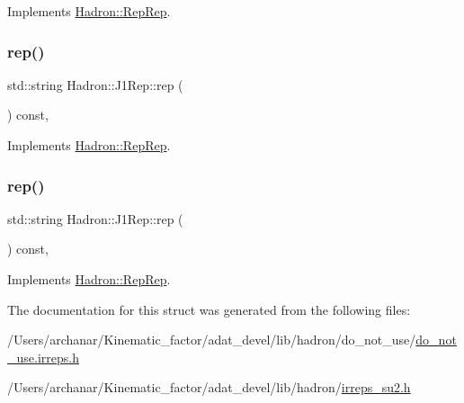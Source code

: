 Implements \mbox{\hyperlink{structHadron_1_1RepRep_ab3213025f6de249f7095892109575fde}{Hadron\+::\+Rep\+Rep}}.

\mbox{\label{structHadron_1_1J1Rep_af725f8ff10c84cda5410728ce30697da}} 
\subsubsection{\texorpdfstring{rep()}{rep()}\hspace{0.1cm}{\footnotesize\ttfamily [2/3]}}
{\footnotesize\ttfamily std\+::string Hadron\+::\+J1\+Rep\+::rep (\begin{DoxyParamCaption}{ }\end{DoxyParamCaption}) const\hspace{0.3cm}{\ttfamily [inline]}, {\ttfamily [virtual]}}



Implements \mbox{\hyperlink{structHadron_1_1RepRep_ab3213025f6de249f7095892109575fde}{Hadron\+::\+Rep\+Rep}}.

\mbox{\label{structHadron_1_1J1Rep_af725f8ff10c84cda5410728ce30697da}} 
\subsubsection{\texorpdfstring{rep()}{rep()}\hspace{0.1cm}{\footnotesize\ttfamily [3/3]}}
{\footnotesize\ttfamily std\+::string Hadron\+::\+J1\+Rep\+::rep (\begin{DoxyParamCaption}{ }\end{DoxyParamCaption}) const\hspace{0.3cm}{\ttfamily [inline]}, {\ttfamily [virtual]}}



Implements \mbox{\hyperlink{structHadron_1_1RepRep_ab3213025f6de249f7095892109575fde}{Hadron\+::\+Rep\+Rep}}.



The documentation for this struct was generated from the following files\+:\begin{DoxyCompactItemize}
\item 
/\+Users/archanar/\+Kinematic\+\_\+factor/adat\+\_\+devel/lib/hadron/do\+\_\+not\+\_\+use/\mbox{\hyperlink{do__not__use_8irreps_8h}{do\+\_\+not\+\_\+use.\+irreps.\+h}}\item 
/\+Users/archanar/\+Kinematic\+\_\+factor/adat\+\_\+devel/lib/hadron/\mbox{\hyperlink{lib_2hadron_2irreps__su2_8h}{irreps\+\_\+su2.\+h}}\end{DoxyCompactItemize}
